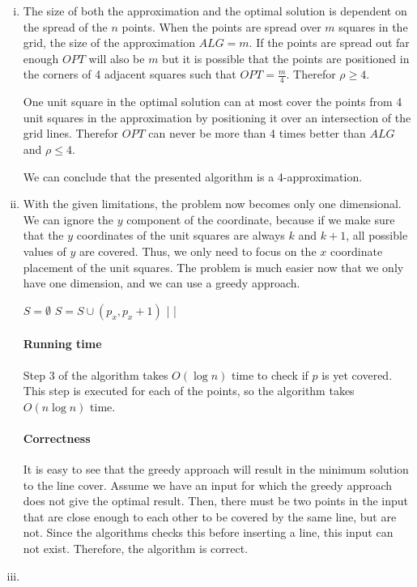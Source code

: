 \begin{enumerate}[(i)]
	\item The size of both the approximation and the optimal solution is dependent on the spread of the $n$ points. When the points are spread over $m$ squares in the grid, the size of the approximation $ALG = m$. If the points are spread out far enough $OPT$ will also be $m$ but it is possible that the points are positioned in the corners of 4 adjacent squares such that $OPT = \frac{m}{4}$. Therefor $\rho \geq 4$. 

One unit square in the optimal solution can at most cover the points from 4 unit squares in the approximation by positioning it over an intersection of the grid lines. Therefor $OPT$ can never be more than 4 times better than $ALG$ and $\rho \leq 4$.  

We can conclude that the presented algorithm is a 4-approximation.
	\item With the given limitations, the problem now becomes only one dimensional.
		We can ignore the $y$ component of the coordinate, because if we make sure that the $y$ coordinates of the unit squares are always $k$ and $k+1$, all possible values of $y$ are covered.
		Thus, we only need to focus on the $x$ coordinate placement of the unit squares.
		The problem is much easier now that we only have one dimension, and we can use a greedy approach.

\begin{sourcecode}
$S = \emptyset$
 
	 
		$S = S \cup (p_x, p_x + 1)$
	|
|
\end{sourcecode}
		\paragraph{Running time} Step 3 of the algorithm takes $O(\log{n})$ time to check if $p$ is yet covered.
			This step is executed for each of the points, so the algorithm takes $O(n \log{n})$ time.

		\paragraph{Correctness} It is easy to see that the greedy approach will result in the minimum solution to the line cover.
			Assume we have an input for which the greedy approach does not give the optimal result.
			Then, there must be two points in the input that are close enough to each other to be covered by the same line, but are not.
			Since the algorithms checks this before inserting a line, this input can not exist.
			Therefore, the algorithm is correct.
	\item
\end{enumerate}
